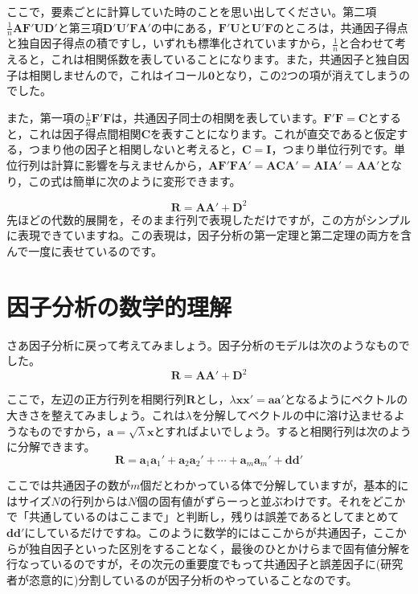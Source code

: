 \documentclass{ltjsbook}
\begin{document}
ここで，要素ごとに計算していた時のことを思い出してください。第二項$\frac{1}{n} \bm{A} \bm{F}'\bm{U} \bm{D}'$と第三項$\bm{D}' \bm{U}' \bm{F} \bm{A}'$の中にある，$\bm{F}' \bm{U}$と$\bm{U}' \bm{F}$のところは，共通因子得点と独自因子得点の積ですし，いずれも標準化されていますから，$\frac{1}{n}$と合わせて考えると，これは相関係数を表していることになります。また，共通因子と独自因子は相関しませんので，これはイコール$\bm{0}$となり，この2つの項が消えてしまうのでした。

また，第一項の$\frac{1}{n}\bm{F} ' \bm{F}$は，共通因子同士の相関を表しています。$\bm{F'F}=\bm{C}$とすると，これは因子得点間相関$\bm{C}$を表すことになります。これが直交であると仮定する，つまり他の因子と相関しないと考えると，$\bm{C} = \bm{I}$，つまり単位行列です。単位行列は計算に影響を与えませんから，$\bm{AF'FA'}=\bm{ACA'}=\bm{AIA'}=\bm{AA'}$となり，この式は簡単に次のように変形できます。

\begin{equation}
	\bm{R} = \bm{A} \bm{A} ' + \bm{D}^2
\end{equation}
先ほどの代数的展開を，そのまま行列で表現しただけですが，この方がシンプルに表現できていますね。この表現は，因子分析の第一定理と第二定理の両方を含んで一度に表せているのです。


\section{因子分析の数学的理解}
さあ因子分析に戻って考えてみましょう。因子分析のモデルは次のようなものでした。
\begin{equation}
	\bm{R} = \bm{A} \bm{A} ' + \bm{D}^2
\end{equation}

ここで，左辺の正方行列を相関行列$\bm{R}$とし，$\lambda \bm{xx'} = \bm{aa'}$となるようにベクトルの大きさを整えてみましょう。これは$\lambda$を分解してベクトルの中に溶け込ませるようなものですから，$\bm{a} = \sqrt{\lambda}\bm{x}$とすればよいでしょう。すると相関行列は次のように分解できます。
\begin{equation}
	\bm{R}=\bm{a}_1\bm{a}_1'+\bm{a}_2\bm{a}_2'+\cdots +\bm{a}_m\bm{a}_m'+\bm{d} \bm{d}'
\end{equation}

ここでは共通因子の数が$m$個だとわかっている体で分解していますが，基本的にはサイズ$N$の行列からは$N$個の固有値がずらーっと並ぶわけです。それをどこかで「共通しているのはここまで」と判断し，残りは誤差であるとしてまとめて$\bm{dd'}$にしているだけですね。このように数学的にはここからが共通因子，ここからが独自因子といった区別をすることなく，最後のひとかけらまで固有値分解を行なっているのですが，その次元の重要度でもって共通因子と誤差因子に(研究者が恣意的に)分割しているのが因子分析のやっていることなのです。
\end{document}
